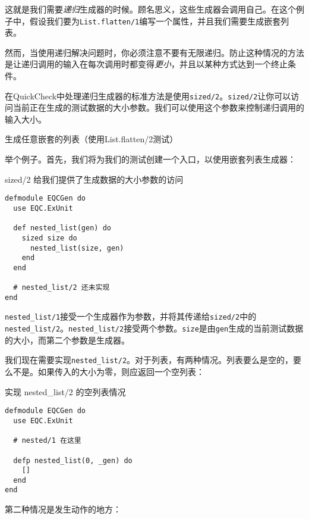 这就是我们需要\emph{递归}生成器的时候。顾名思义，这些生成器会调用自己。在这个例子中，假设我们要为\texttt{List.flatten/1}编写一个属性，并且我们需要生成嵌套列表。

然而，当使用递归解决问题时，你必须注意不要有无限递归。防止这种情况的方法是让递归调用的输入在每次调用时都变得\emph{更小}，并且以某种方式达到一个终止条件。

在QuickCheck中处理递归生成器的标准方法是使用\texttt{sized/2}。\texttt{sized/2}让你可以访问当前正在生成的测试数据的大小参数。我们可以使用这个参数来控制递归调用的输入大小。

\begin{example}{生成任意嵌套的列表（使用List.flatten/2测试）}
\end{example}

举个例子。首先，我们将为我们的测试创建一个入口，以使用嵌套列表生成器：

\begin{code}{sized/2 给我们提供了生成数据的大小参数的访问}
\begin{verbatim}
defmodule EQCGen do
  use EQC.ExUnit

  def nested_list(gen) do
    sized size do
      nested_list(size, gen)
    end
  end

  # nested_list/2 还未实现
end
\end{verbatim}
\label{lst:sized_2_gives_us_access_to_the_size_parameter_of_the_generated_data}
\end{code}

\texttt{nested\_list/1}接受一个生成器作为参数，并将其传递给\texttt{sized/2}中的\texttt{nested\_list/2}。\texttt{nested\_list/2}接受两个参数。\texttt{size}是由\texttt{gen}生成的当前测试数据的大小，而第二个参数是生成器。

我们现在需要实现\texttt{nested\_list/2}。对于列表，有两种情况。列表要么是空的，要么不是。如果传入的大小为零，则应返回一个空列表：


\begin{code}{实现 nested\_list/2 的空列表情况}
\begin{verbatim}
defmodule EQCGen do
  use EQC.ExUnit

  # nested/1 在这里

  defp nested_list(0, _gen) do
    []
  end
end
\end{verbatim}
\label{lst:implementing_the_empty_list_case_of_nested_2}
\end{code}

第二种情况是发生动作的地方：


